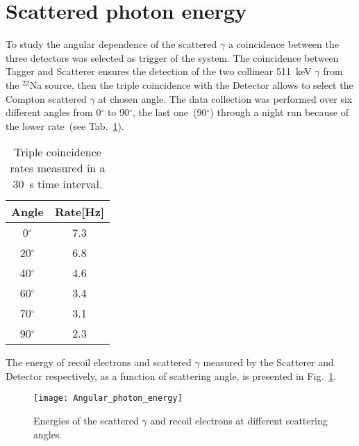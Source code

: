 \section*{Scattered photon energy}
To study the angular dependence of the scattered $\gamma$ a coincidence between the three detectors was selected as trigger of the system. The coincidence between Tagger and Scatterer ensures the detection of the  two collinear 511~keV $\gamma$ from the $^{22}$Na source, then the triple coincidence with the Detector allows to select the Compton scattered $\gamma$ at chosen angle. The data collection was performed over six different angles from 0$^\circ$ to 90$^\circ$, the last one~(90$^\circ$) through a night run because of the lower rate~(see Tab.~\ref{Tab:Rates}). 
\begin{table}[H]
	\centering
	\begin{tabular}{cc}
		\toprule
		\toprule
		 Angle & Rate[Hz] \\
		\midrule
		   0$^\circ$ & 7.3 \\
		20$^\circ$ & 6.8\\
	    40$^\circ$ & 4.6\\
	    60$^\circ$ & 3.4\\
	    70$^\circ$ & 3.1\\
	    90$^\circ$ & 2.3\\
		\bottomrule
		\bottomrule
	\end{tabular}
	\caption{Triple coincidence rates measured in a 30~s time interval.}
	\label{Tab:Rates}
\end{table}

The energy of recoil electrons and scattered $\gamma$ measured by the Scatterer and Detector respectively, as a function of scattering angle, is presented in Fig.~\ref{Fig:Scattering_angles}.

\begin{figure}[h!]
	\centering
	\texttt{[image: Angular\_photon\_energy]}
	\caption{Energies of the scattered $\gamma$ and recoil electrons at different scattering angles.}
	\label{Fig:Scattering_angles}
\end{figure}